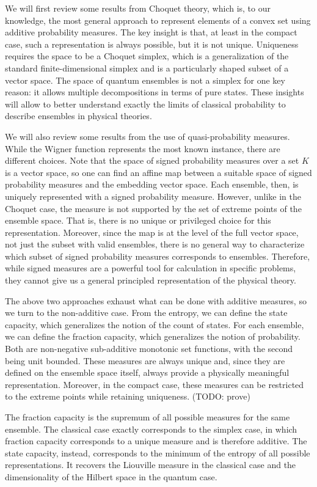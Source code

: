 \documentclass[10pt,twocolumn, nofootinbib]{revtex4-2}
\begin{document}
We will first review some results from Choquet theory, which is, to our knowledge, the most general approach to represent elements of a convex set using additive probability measures. The key insight is that, at least in the compact case, such a representation is always possible, but it is not unique. Uniqueness requires the space to be a Choquet simplex, which is a generalization of the standard finite-dimensional simplex and is a particularly shaped subset of a vector space. The space of quantum ensembles is not a simplex for one key reason: it allows multiple decompositions in terms of pure states. These insights will allow to better understand exactly the limits of classical probability to describe ensembles in physical theories.

We will also review some results from the use of quasi-probability measures. While the Wigner function represents the most known instance, there are different choices. Note that the space of signed probability measures over a set $K$ is a vector space, so one can find an affine map between a suitable space of signed probability measures and the embedding vector space. Each ensemble, then, is uniquely represented with a signed probability measure. However, unlike in the Choquet case, the measure is not supported by the set of extreme points of the ensemble space. That is, there is no unique or privileged choice for this representation. Moreover, since the map is at the level of the full vector space, not just the subset with valid ensembles, there is no general way to characterize which subset of signed probability measures corresponds to ensembles. Therefore, while signed measures are a powerful tool for calculation in specific problems, they cannot give us a general principled representation of the physical theory.

The above two approaches exhaust what can be done with additive measures, so we turn to the non-additive case. From the entropy, we can define the state capacity, which generalizes the notion of the count of states. For each ensemble, we can define the fraction capacity, which generalizes the notion of probability. Both are non-negative sub-additive monotonic set functions, with the second being unit bounded. These measures are always unique and, since they are defined on the ensemble space itself, always provide a physically meaningful representation. Moreover, in the compact case, these measures can be restricted to the extreme points while retaining uniqueness. (TODO: prove)

The fraction capacity is the supremum of all possible measures for the same ensemble. The classical case exactly corresponds to the simplex case, in which fraction capacity corresponds to a unique measure and is therefore additive. The state capacity, instead, corresponds to the minimum of the entropy of all possible representations. It recovers the Liouville measure in the classical case and the dimensionality of the Hilbert space in the quantum case.
\end{document}
